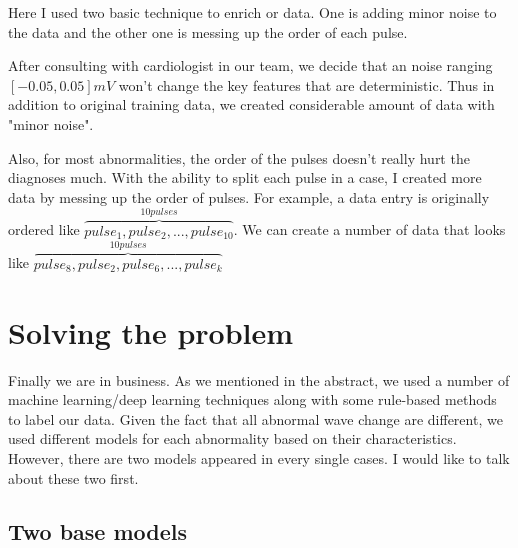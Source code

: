 \documentclass[runningheads]{llncs}
\begin{document}
Here I used two basic technique to enrich or data. One is adding minor noise to the data and the other one is messing up the order of each pulse. 

After consulting with cardiologist in our team, we decide that an noise ranging $[-0.05, 0.05] mV$ won't change the key features that are deterministic. Thus in addition to original training data, we created considerable amount of data with "minor noise".

Also, for most abnormalities, the order of the pulses doesn't really hurt the diagnoses much. With the ability to split each pulse in a case, I created more data by messing up the order of pulses. For example, a data entry is originally ordered like $\overbrace{pulse_1, pulse_2, ... , pulse_10}^{10 pulses}$. We can create a number of data that looks like $\overbrace{pulse_8, pulse_2, pulse_6, ... , pulse_k}^{10 pulses}$

\section{Solving the problem}
Finally we are in business. As we mentioned in the abstract, we used a number of machine learning/deep learning techniques along with some rule-based methods to label our data. Given the fact that all abnormal wave change are different, we used different models for each abnormality based on their characteristics. However, there are two models appeared in every single cases. I would like to talk about these two first.

\subsection{Two base models}
\end{document}
